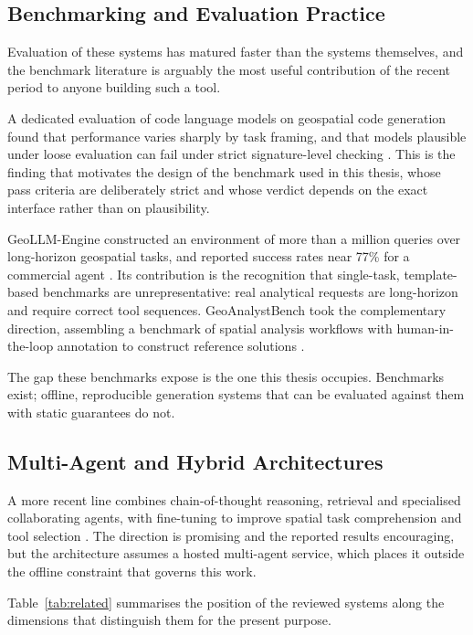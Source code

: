 \subsection{Benchmarking and Evaluation Practice}

Evaluation of these systems has matured faster than the systems themselves, and
the benchmark literature is arguably the most useful contribution of the recent
period to anyone building such a tool.

A dedicated evaluation of code language models on geospatial code generation
found that performance varies sharply by task framing, and that models
plausible under loose evaluation can fail under strict signature-level checking
\cite{evalcodellms2024}. This is the finding that motivates the design of the
benchmark used in this thesis, whose pass criteria are deliberately strict and
whose verdict depends on the exact interface rather than on plausibility.

GeoLLM-Engine constructed an environment of more than a million queries over
long-horizon geospatial tasks, and reported success rates near 77\% for a
commercial agent \cite{singh2024geollmengine}. Its contribution is the
recognition that single-task, template-based benchmarks are unrepresentative:
real analytical requests are long-horizon and require correct tool sequences.
GeoAnalystBench took the complementary direction, assembling a benchmark of
spatial analysis workflows with human-in-the-loop annotation to construct
reference solutions \cite{zhang2025geoanalystbench}.

The gap these benchmarks expose is the one this thesis occupies. Benchmarks
exist; offline, reproducible generation systems that can be evaluated against
them with static guarantees do not.

\subsection{Multi-Agent and Hybrid Architectures}

A more recent line combines chain-of-thought reasoning, retrieval and
specialised collaborating agents, with fine-tuning to improve spatial task
comprehension and tool selection \cite{mansourian2026multia}. The direction is
promising and the reported results encouraging, but the architecture assumes a
hosted multi-agent service, which places it outside the offline constraint that
governs this work.

Table~\ref{tab:related} summarises the position of the reviewed systems along
the dimensions that distinguish them for the present purpose.

